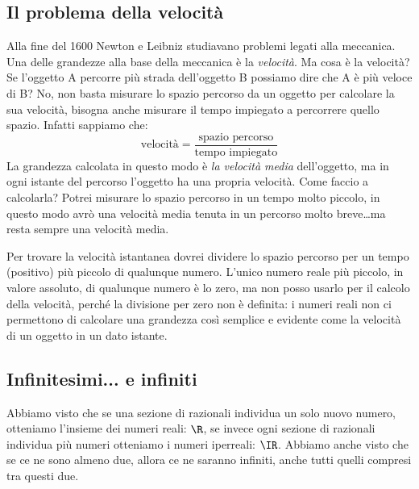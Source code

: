 \subsection{Il problema della velocità}
\label{subsec:insnum_velocita}

Alla fine del 1600 Newton e Leibniz studiavano problemi legati alla 
meccanica. 
Una delle grandezze alla base della meccanica è la \emph{velocità}. 
Ma cosa è la velocità? 
Se l'oggetto A percorre più strada dell'oggetto B possiamo dire 
che A è più veloce di B? No, non basta misurare lo spazio percorso da un 
oggetto per calcolare la sua velocità, bisogna anche misurare il tempo 
impiegato a percorrere quello spazio. Infatti sappiamo che:
\[\text{velocità} = 
  \frac{\text{spazio percorso}}{\text{tempo impiegato}}\]
La grandezza calcolata in questo modo è \emph{la velocità media} 
dell'oggetto, ma in ogni istante del percorso l'oggetto ha una propria 
velocità. 
Come faccio a calcolarla? Potrei misurare lo spazio percorso in un tempo 
molto piccolo, in questo modo avrò una velocità media tenuta in un percorso 
molto breve\dots ma resta sempre una velocità media. 

Per trovare la velocità istantanea dovrei dividere lo spazio percorso per 
un tempo (positivo) più piccolo di qualunque numero. L'unico numero reale
più piccolo, in valore assoluto, di qualunque numero è lo zero, ma 
non posso usarlo per il calcolo della velocità, perché la divisione per 
zero non è definita: i numeri reali non ci permettono di calcolare una 
grandezza così semplice e evidente come la velocità di un oggetto in un 
dato istante.


\subsection{Infinitesimi... e infiniti}
\label{subsec:insnum_nonarchimedei}

Abbiamo visto che se una sezione di razionali individua un solo nuovo numero, 
otteniamo l'insieme dei numeri reali: \(\R\), se invece ogni sezione di 
razionali individua più numeri otteniamo i numeri iperreali: \(\IR\).
Abbiamo anche visto che se ce ne sono almeno due, allora ce ne saranno 
infiniti, anche tutti quelli compresi tra questi due.

